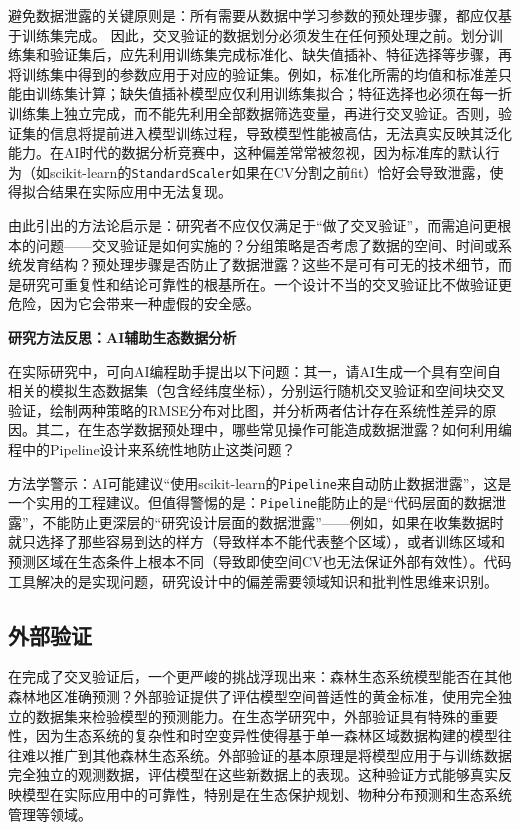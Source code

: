 \documentclass[
  twoside,12pt,fontset=none]{ctexbook}
\renewenvironment{quote}{%
  \def\FrameCommand{{\color{quote-border}\vrule width 4pt}\hspace{10pt}}%
  \MakeFramed {\advance\hsize-\width \FrameRestore\noindent\ignorespaces}%
}{%
  \endMakeFramed
}
\begin{document}
避免数据泄露的关键原则是：所有需要从数据中学习参数的预处理步骤，都应仅基于训练集完成。 因此，交叉验证的数据划分必须发生在任何预处理之前。划分训练集和验证集后，应先利用训练集完成标准化、缺失值插补、特征选择等步骤，再将训练集中得到的参数应用于对应的验证集。例如，标准化所需的均值和标准差只能由训练集计算；缺失值插补模型应仅利用训练集拟合；特征选择也必须在每一折训练集上独立完成，而不能先利用全部数据筛选变量，再进行交叉验证。否则，验证集的信息将提前进入模型训练过程，导致模型性能被高估，无法真实反映其泛化能力。在AI时代的数据分析竞赛中，这种偏差常常被忽视，因为标准库的默认行为（如scikit-learn的\texttt{StandardScaler}如果在CV分割之前fit）恰好会导致泄露，使得拟合结果在实际应用中无法复现。

由此引出的方法论启示是：研究者不应仅仅满足于``做了交叉验证''，而需追问更根本的问题------交叉验证是如何实施的？分组策略是否考虑了数据的空间、时间或系统发育结构？预处理步骤是否防止了数据泄露？这些不是可有可无的技术细节，而是研究可重复性和结论可靠性的根基所在。一个设计不当的交叉验证比不做验证更危险，因为它会带来一种虚假的安全感。

\begin{quote}
\textbf{研究方法反思：AI辅助生态数据分析}

在实际研究中，可向AI编程助手提出以下问题：其一，请AI生成一个具有空间自相关的模拟生态数据集（包含经纬度坐标），分别运行随机交叉验证和空间块交叉验证，绘制两种策略的RMSE分布对比图，并分析两者估计存在系统性差异的原因。其二，在生态学数据预处理中，哪些常见操作可能造成数据泄露？如何利用编程中的Pipeline设计来系统性地防止这类问题？

方法学警示：AI可能建议``使用scikit-learn的\texttt{Pipeline}来自动防止数据泄露''，这是一个实用的工程建议。但值得警惕的是：\texttt{Pipeline}能防止的是``代码层面的数据泄露''，不能防止更深层的``研究设计层面的数据泄露''------例如，如果在收集数据时就只选择了那些容易到达的样方（导致样本不能代表整个区域），或者训练区域和预测区域在生态条件上根本不同（导致即使空间CV也无法保证外部有效性）。代码工具解决的是实现问题，研究设计中的偏差需要领域知识和批判性思维来识别。
\end{quote}

\hypertarget{ux5916ux90e8ux9a8cux8bc1}{%
\subsection{外部验证}\label{ux5916ux90e8ux9a8cux8bc1}}

在完成了交叉验证后，一个更严峻的挑战浮现出来：森林生态系统模型能否在其他森林地区准确预测？外部验证提供了评估模型空间普适性的黄金标准，使用完全独立的数据集来检验模型的预测能力。在生态学研究中，外部验证具有特殊的重要性，因为生态系统的复杂性和时空变异性使得基于单一森林区域数据构建的模型往往难以推广到其他森林生态系统。外部验证的基本原理是将模型应用于与训练数据完全独立的观测数据，评估模型在这些新数据上的表现。这种验证方式能够真实反映模型在实际应用中的可靠性，特别是在生态保护规划、物种分布预测和生态系统管理等领域。
\end{document}
